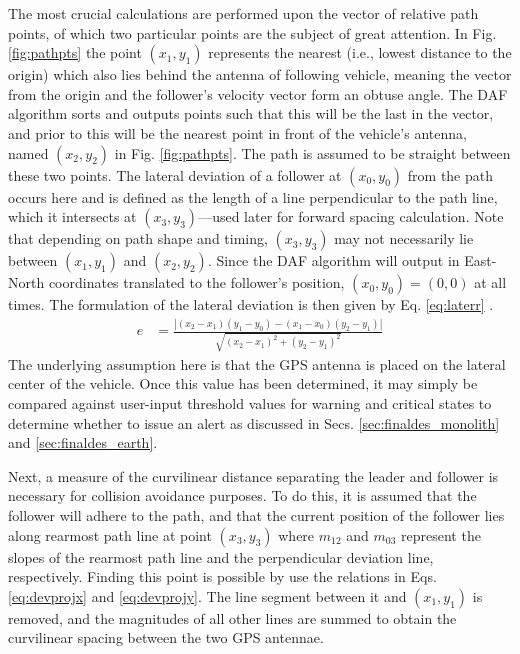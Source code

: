 The most crucial calculations are performed upon the vector of relative path points, of which two particular points are the subject of great attention. In Fig. \ref{fig:pathpts} the point $(x_1,y_1)$ represents the nearest (i.e., lowest distance to the origin) which also lies behind the antenna of following vehicle, meaning the vector from the origin and the follower's velocity vector form an obtuse angle. The DAF algorithm sorts and outputs points such that this will be the last in the vector, and prior to this will be the nearest point in front of the vehicle's antenna, named $(x_2,y_2)$ in Fig. \ref{fig:pathpts}. The path is assumed to be straight between these two points. The lateral deviation of a follower at $(x_0, y_0)$ from the path occurs here and is defined as the length of a line perpendicular to the path line, which it intersects at $(x_3,y_3)$---used later for forward spacing calculation. Note that depending on path shape and timing, $(x_3,y_3)$ may not necessarily lie between $(x_1,y_1)$ and $(x_2,y_2)$. Since the DAF algorithm will output in East-North coordinates translated to the follower's position, $(x_0, y_0)=(0,0)$ at all times. The formulation of the lateral deviation is then given by Eq. \eqref{eq:laterr} \cite{laterrformula}. 
\begin{align} \label{eq:laterr}
    e &= \frac{ | (x_2 - x_1)(y_1 - y_0) - (x_1 - x_0)(y_2 - y_1) | } { \sqrt{ (x_2 - x_1)^2 + (y_2 - y_1)^2 } }
\end{align}
The underlying assumption here is that the GPS antenna is placed on the lateral center of the vehicle. Once this value has been determined, it may simply be compared against user-input threshold values for warning and critical states to determine whether to issue an alert as discussed in Secs. \ref{sec:finaldes_monolith} and \ref{sec:finaldes_earth}.



Next, a measure of the curvilinear distance separating the leader and follower is necessary for collision avoidance purposes. To do this, it is assumed that the follower will adhere to the path, and that the current position of the follower lies along rearmost path line at point $(x_3, y_3)$ where $m_{12}$ and $m_{03}$ represent the slopes of the rearmost path line and the perpendicular deviation line, respectively. Finding this point is possible by use the relations in Eqs. \eqref{eq:devprojx} and \eqref{eq:devprojy}. The line segment between it and $(x_1,y_1)$ is removed, and the magnitudes of all other lines are summed to obtain the curvilinear spacing between the two GPS antennae. 

